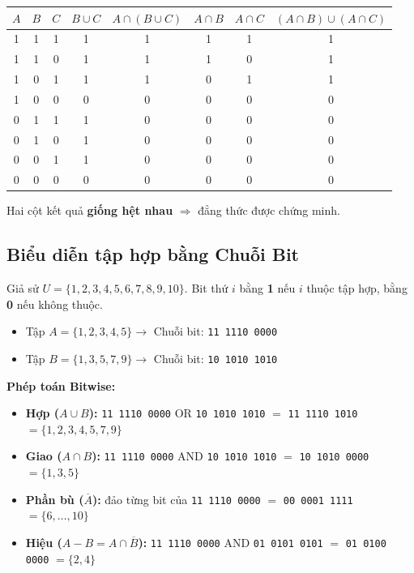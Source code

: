 \documentclass[12pt,a4paper]{article}
\begin{document}
\begin{center}
\renewcommand{\arraystretch}{1.2}
\begin{tabular}{|c|c|c||c|c||c|c|c|}
\hline
$A$ & $B$ & $C$ & $B \cup C$ & $A \cap (B \cup C)$ & $A \cap B$ & $A \cap C$ & $(A \cap B) \cup (A \cap C)$ \\
\hline
1 & 1 & 1 & 1 & \textcolor{AccentRed}{1} & 1 & 1 & \textcolor{AccentRed}{1} \\ \hline
1 & 1 & 0 & 1 & \textcolor{AccentRed}{1} & 1 & 0 & \textcolor{AccentRed}{1} \\ \hline
1 & 0 & 1 & 1 & \textcolor{AccentRed}{1} & 0 & 1 & \textcolor{AccentRed}{1} \\ \hline
1 & 0 & 0 & 0 & \textcolor{AccentRed}{0} & 0 & 0 & \textcolor{AccentRed}{0} \\ \hline
0 & 1 & 1 & 1 & \textcolor{AccentRed}{0} & 0 & 0 & \textcolor{AccentRed}{0} \\ \hline
0 & 1 & 0 & 1 & \textcolor{AccentRed}{0} & 0 & 0 & \textcolor{AccentRed}{0} \\ \hline
0 & 0 & 1 & 1 & \textcolor{AccentRed}{0} & 0 & 0 & \textcolor{AccentRed}{0} \\ \hline
0 & 0 & 0 & 0 & \textcolor{AccentRed}{0} & 0 & 0 & \textcolor{AccentRed}{0} \\ \hline
\end{tabular}
\end{center}

Hai cột kết quả \textbf{giống hệt nhau} $\Rightarrow$ đẳng thức được chứng minh.

\subsection{Biểu diễn tập hợp bằng Chuỗi Bit}

Giả sử $U = \{1, 2, 3, 4, 5, 6, 7, 8, 9, 10\}$. Bit thứ $i$ bằng \textbf{1} nếu $i$ thuộc tập hợp, bằng \textbf{0} nếu không thuộc.
\begin{itemize}
  \item Tập $A = \{1, 2, 3, 4, 5\} \rightarrow$ Chuỗi bit: \texttt{11 1110 0000}
  \item Tập $B = \{1, 3, 5, 7, 9\} \rightarrow$ Chuỗi bit: \texttt{10 1010 1010}
\end{itemize}

\textbf{Phép toán Bitwise:}
\begin{itemize}
  \item \textbf{Hợp ($A \cup B$):} \texttt{11 1110 0000} OR \texttt{10 1010 1010} $=$ \textcolor{AccentRed}{\texttt{11 1110 1010}} $= \{1, 2, 3, 4, 5, 7, 9\}$
  \item \textbf{Giao ($A \cap B$):} \texttt{11 1110 0000} AND \texttt{10 1010 1010} $=$ \textcolor{AccentRed}{\texttt{10 1010 0000}} $= \{1, 3, 5\}$
  \item \textbf{Phần bù ($\overline{A}$):} đảo từng bit của \texttt{11 1110 0000} $=$ \textcolor{AccentRed}{\texttt{00 0001 1111}} $= \{6, \dots, 10\}$
  \item \textbf{Hiệu ($A - B = A \cap \overline{B}$):} \texttt{11 1110 0000} AND \texttt{01 0101 0101} $=$ \textcolor{AccentRed}{\texttt{01 0100 0000}} $= \{2, 4\}$
\end{itemize}
\end{document}
